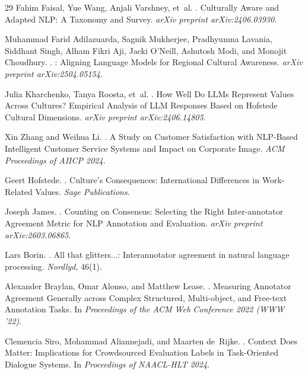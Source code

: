 \documentclass[11pt]{article}
\begin{document}
\begin{table}[t]
\begin{thebibliography}{29}
Fahim Faisal, Yue Wang, Anjali Varshney, et~al.
.
\newblock Culturally Aware and Adapted {NLP}: A Taxonomy and Survey.
\newblock \emph{arXiv preprint arXiv:2406.03930}.

Muhammad Farid Adilazuarda, Sagnik Mukherjee, Pradhyumna Lavania, Siddhant Singh, Alham Fikri Aji, Jacki O'Neill, Ashutosh Modi, and Monojit Choudhury.
.
: Aligning Language Models for Regional Cultural Awareness.
\newblock \emph{arXiv preprint arXiv:2504.05154}.

Julia Kharchenko, Tanya Roosta, et~al.
.
\newblock How Well Do {LLMs} Represent Values Across Cultures? Empirical Analysis of {LLM} Responses Based on Hofstede Cultural Dimensions.
\newblock \emph{arXiv preprint arXiv:2406.14805}.

Xin Zhang and Weihua Li.
.
\newblock A Study on Customer Satisfaction with {NLP}-Based Intelligent Customer Service Systems and Impact on Corporate Image.
\newblock \emph{ACM Proceedings of AIICP 2024}.

Geert Hofstede.
.
\newblock Culture's Consequences: International Differences in Work-Related Values.
\newblock \emph{Sage Publications}.

Joseph James.
.
\newblock Counting on Consensus: Selecting the Right Inter-annotator Agreement Metric for {NLP} Annotation and Evaluation.
\newblock \emph{arXiv preprint arXiv:2603.06865}.

Lars Borin.
.
\newblock All that glitters...: Interannotator agreement in natural language processing.
\newblock \emph{Nordlyd}, 46(1).

Alexander Braylan, Omar Alonso, and Matthew Lease.
.
\newblock Measuring Annotator Agreement Generally across Complex Structured, Multi-object, and Free-text Annotation Tasks.
\newblock In \emph{Proceedings of the ACM Web Conference 2022 (WWW '22)}.

Clemencia Siro, Mohammad Aliannejadi, and Maarten de~Rijke.
.
\newblock Context Does Matter: Implications for Crowdsourced Evaluation Labels in Task-Oriented Dialogue Systems.
\newblock In \emph{Proceedings of NAACL-HLT 2024}.


\end{thebibliography}
\end{table}
\end{document}
